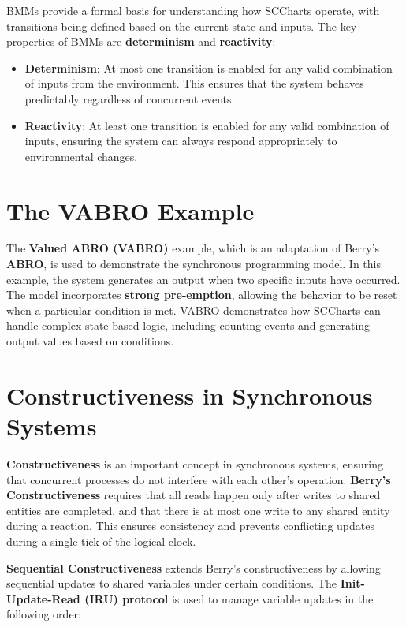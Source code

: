 \documentclass[
  14pt,
  a4paper,
  numbers=noendperiod,
  headinclude=true,
  footinclude=true,
  DIV=calc]{scrreprt}
\begin{document}
BMMs provide a formal basis for understanding how SCCharts operate, with
transitions being defined based on the current state and inputs. The key
properties of BMMs are \textbf{determinism} and \textbf{reactivity}:

\begin{itemize}
\item
  \textbf{Determinism}: At most one transition is enabled for any valid
  combination of inputs from the environment. This ensures that the
  system behaves predictably regardless of concurrent events.
\item
  \textbf{Reactivity}: At least one transition is enabled for any valid
  combination of inputs, ensuring the system can always respond
  appropriately to environmental changes.
\end{itemize}

\section{The VABRO Example}\label{the-vabro-example}

The \textbf{Valued ABRO (VABRO)} example, which is an adaptation of
Berry's \textbf{ABRO}, is used to demonstrate the synchronous
programming model. In this example, the system generates an output when
two specific inputs have occurred. The model incorporates \textbf{strong
pre-emption}, allowing the behavior to be reset when a particular
condition is met. VABRO demonstrates how SCCharts can handle complex
state-based logic, including counting events and generating output
values based on conditions.

\section{Constructiveness in Synchronous
Systems}\label{constructiveness-in-synchronous-systems}

\textbf{Constructiveness} is an important concept in synchronous
systems, ensuring that concurrent processes do not interfere with each
other's operation. \textbf{Berry's Constructiveness} requires that all
reads happen only after writes to shared entities are completed, and
that there is at most one write to any shared entity during a reaction.
This ensures consistency and prevents conflicting updates during a
single tick of the logical clock.

\textbf{Sequential Constructiveness} extends Berry's constructiveness by
allowing sequential updates to shared variables under certain
conditions. The \textbf{Init-Update-Read (IRU) protocol} is used to
manage variable updates in the following order:
\end{document}
